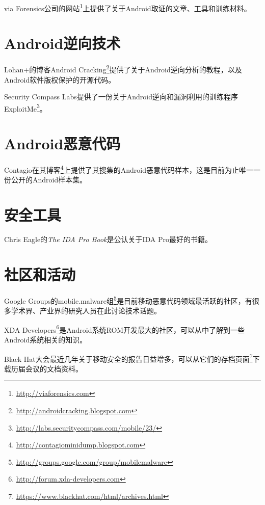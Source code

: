 via Forensics公司的网站\footnote{\url{http://viaforensics.com}}上提供了关于Android取证的文章、工具和训练材料。

\section*{Android逆向技术}
Lohan+的博客Android Cracking\footnote{\url{http://androidcracking.blogspot.com}}提供了关于Android逆向分析的教程，以及Android软件版权保护的开源代码。

Security Compass Labs提供了一份关于Android逆向和漏洞利用的训练程序ExploitMe\footnote{\url{http://labs.securitycompass.com/mobile/23/}}。

\section*{Android恶意代码}
Contagio在其博客\footnote{\url{http://contagiominidump.blogspot.com}}上提供了其搜集的Android恶意代码样本，这是目前为止唯一一份公开的Android样本集。

\section*{安全工具}
Chris Eagle的{\it The IDA Pro Book}\cite{ida_pro}是公认关于IDA Pro最好的书籍。

\section*{社区和活动}
Google Groups的mobile.malware组\footnote{\url{http://groups.google.com/group/mobilemalware}}是目前移动恶意代码领域最活跃的社区，有很多学术界、产业界的研究人员在此讨论技术话题。

XDA Developers\footnote{\url{http://forum.xda-developers.com}}是Android系统ROM开发最大的社区，可以从中了解到一些Android系统相关的知识。

Black Hat大会最近几年关于移动安全的报告日益增多，可以从它们的存档页面\footnote{\url{https://www.blackhat.com/html/archives.html}}下载历届会议的文档资料。

